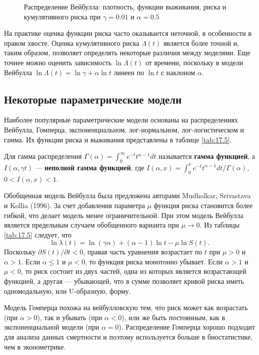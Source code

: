 \begin{figure}[ht!]\caption{Распределение Вейбулла: плотность, функции выживания, риска и кумулятивного риска при $\gamma=0.01$ и $\alpha=0.5$}\label{fig:17.2}
\centering
\end{figure}

На практике оценка функции риска часто оказывается неточной, в особенности в правом хвосте. Оценка кумулятивного риска $\Lambda(t)$ является более точной и, таким образом, позволяет определять некоторые различия между моделями. Еще точнее можно оценить зависимость $\ln\Lambda(t)$ от времени, поскольку в модели Вейбулла $\ln\Lambda(t)=\ln\gamma+\alpha\ln t$ линеен по $\ln t$ с наклоном $\alpha$.


\subsection{Некоторые параметрические модели}\label{sec:17.6.2}

\noindent
Наиболее популярные параметрические модели основаны на распределениях Вейбулла, Гомперца, экспоненциальном, лог-нормальном, лог-логистическом и гамма. Их функции риска и выживания представлены в таблице \ref{tab:17.5}.

Для гамма распределения $\Gamma(\alpha)=\int^{\infty}_{0}e^{-t}t^{\alpha-1}dt$ называется \textbf{гамма функцией}, а $I(\alpha,\gamma t)$ --- \textbf{неполной гамма функцией}, где $I(\alpha,x)=\int^{x}_{0}e^{-t}t^{\alpha-1}dt/\Gamma(\alpha)$, $0<I(\alpha,x)<1$.

Обобщенная модель Вейбулла была предложена авторами Mudholkar, Srivastava и Kollia (1996). За счет добавления параметра $\mu$ функция риска становится более гибкой, что делает модель менее ограничительной. При этом модель Вейбулла является предельным случаем обобщенного варианта при $\mu\rightarrow 0$. Из таблицы \ref{tab:17.5} следует, что
    $$\ln\lambda(t)=\ln(\gamma\alpha)+(\alpha-1)\ln t-\mu\ln S(t).$$
Поскольку $\partial S(t)/\partial t<0$, правая часть уравнения возрастает по $t$ при $\mu>0$ и $\alpha>1$. Если $\alpha\le1$ и $\mu<0$, то функция риска монотонно убывает. Если $\alpha>1$ и $\mu<0$, то риск состоит из двух частей, одна из которых является возрастающей функцией, а другая --- убывающей, что в сумме позволяет кривой риска иметь одномодальную, или U-образную, форму.

Модель Гомперца похожа на вейбулловскую тем, что риск может как возрастать (при $\alpha>0$), так и убывать (при $\alpha<0$), или же быть постоянным, как в экспоненциальной модели (при $\alpha=0$). Распределение Гомперца хорошо подходит для анализа данных смертности и поэтому используется больше в биостатистике, чем в эконометрике.

